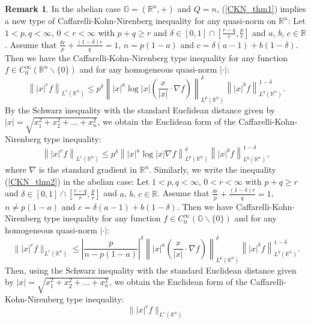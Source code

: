 \documentclass[a4paper,12pt,reqno]{amsart}
\renewcommand\eqref[1]{(\ref{#1})} %
\numberwithin{equation}{section}
\theoremstyle{plain}
\theoremstyle{definition}
\newtheorem{rem}[thm]{Remark}
\newcommand{\Rn}{\mathbb R^{n}}
\begin{document}
\begin{rem}\label{CKN_rem1}
In the abelian case $\mathbb{G}=(\Rn,+)$ and $Q=n$, \eqref{CKN_thm1} implies a new type of Caffarelli-Kohn-Nirenberg inequality for any quasi-norm on $\Rn$: Let $1<p,q<\infty$, $0<r<\infty$ with $p+q\geq r$ and $\delta\in[0,1]\cap\left[\frac{r-q}{r},\frac{p}{r}\right]$ and $a$, $b$, $c\in\mathbb{R}$. Assume that $\frac{\delta r}{p}+\frac{(1-\delta)r}{q}=1$, $n=p(1-a)$ and $c=\delta(a-1)+b(1-\delta)$. Then we have the Caffarelli-Kohn-Nirenberg type inequality for any function $f\in C_{0}^{\infty}(\mathbb{R}^{n}\backslash\{0\})$ and for any homogeneous quasi-norm $|\cdot|$:
\begin{equation}\label{CKN_rem2}
\left\||x|^{c}f\right\|_{L^{r}(\Rn)}
\leq p^{\delta} \left\||x|^{a}\log|x|\left(\frac{x}{|x|}\cdot\nabla f\right)\right\|^{\delta}_{L^{p}(\Rn)}
\left\||x|^{b}f\right\|^{1-\delta}_{L^{q}(\Rn)}.
\end{equation}
By the Schwarz inequality with the standard Euclidean distance given by $|x|=\sqrt{x_{1}^{2}+x_{2}^{2}+...+x_{n}^{2}}$, we obtain the Euclidean form of the Caffarelli-Kohn-Nirenberg type inequality:
\begin{equation}\label{CKN_rem3}
\left\||x|^{c}f\right\|_{L^{r}(\Rn)}
\leq p^{\delta} \left\||x|^{a}\log|x|\nabla f\right\|^{\delta}_{L^{p}(\Rn)}
\left\||x|^{b}f\right\|^{1-\delta}_{L^{q}(\Rn)},
\end{equation}
where $\nabla$ is the standard gradient in $\Rn$.
Similarly, we write the inequality \eqref{CKN_thm2} in the abelian case: Let $1<p,q<\infty$, $0<r<\infty$ with $p+q\geq r$ and $\delta\in[0,1]\cap\left[\frac{r-q}{r},\frac{p}{r}\right]$ and $a$, $b$, $c\in\mathbb{R}$. Assume that $\frac{\delta r}{p}+\frac{(1-\delta)r}{q}=1$, $n\neq p(1-a)$ and $c=\delta(a-1)+b(1-\delta)$. Then we have Caffarelli-Kohn-Nirenberg type inequality for any function $f\in C_{0}^{\infty}(\mathbb{G}\backslash\{0\})$ and for any homogeneous quasi-norm $|\cdot|$:
\begin{equation}
\||x|^{c}f\|_{L^{r}(\Rn)}
\leq \left|\frac{p}{n-p(1-a)}\right|^{\delta} \left\||x|^{a}\left(\frac{x}{|x|}\cdot\nabla f\right)\right\|^{\delta}_{L^{p}(\Rn)}
\left\||x|^{b}f\right\|^{1-\delta}_{L^{q}(\Rn)}.
\end{equation}
Then, using the Schwarz inequality with the standard Euclidean distance given by $|x|=\sqrt{x_{1}^{2}+x_{2}^{2}+...+x_{n}^{2}}$, we obtain the Euclidean form of the Caffarelli-Kohn-Nirenberg type inequality:
\begin{equation}\label{CKN_rem3_1}
\||x|^{c}f\|_{L^{r}(\Rn)}

\end{equation}
\end{rem}
\end{document}
